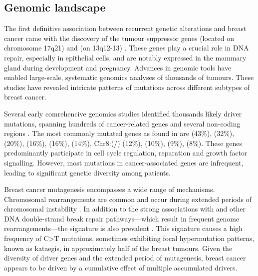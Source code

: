 \subsection{Genomic landscape} 

The first definitive association between recurrent genetic alterations and breast cancer came with the discovery of the tumour suppressor genes  (located on chromosome 17q21) and  (on 13q12-13) \parencite{Wooster1994-xa, Hall1990-mg}. These genes play a crucial role in DNA repair, especially in epithelial cells, and are notably expressed in the mammary gland during development and pregnancy. Advances in genomic tools have enabled large-scale, systematic genomics analyses of thousands of tumours. These studies have revealed intricate patterns of mutations across different subtypes of breast cancer.

Several early comrehencive genomics studies identified thousands likely driver mutations, spanning hundreds of cancer-related genes and several non-coding regions \parencite{Cancer_Genome_Atlas_Network2012-gx,Shah2012-xz, Nik-Zainal2016-ek,Banerji2012-as,Ciriello2015-ey,Pereira2016-ov}. The most commonly mutated genes as found in \textcite{Cancer_Genome_Atlas_Network2012-gx} are  (43\%),  (32\%),  (20\%),  (16\%),  (16\%),  (14\%), Chr8:(/) (12\%),  (10\%),  (9\%),  (8\%). These genes predominantly participate in cell cycle regulation, reparation and growth factor signalling. However, most mutations in cancer-associated genes are infrequent, leading to significant genetic diversity among patients.

Breast cancer mutagenesis encompasses a wide range of mechanisms. Chromosomal rearrangements are common and occur during extended periods of chromosomal instability \parencite{Gerstung2020-sg}. In addition to the strong associations with  and other DNA double-strand break repair pathways—which result in frequent genome rearrangements—the  signature is also prevalent \parencite{Nik-Zainal2016-ek, Banerji2012-as}. This signature causes a high frequency of C>T mutations, sometimes exhibiting focal hypermutation patterns, known as kataegis, in approximately half of the breast tumours. Given the diversity of driver genes and the extended period of mutagenesis, breast cancer appears to be driven by a cumulative effect of multiple accumulated drivers.

